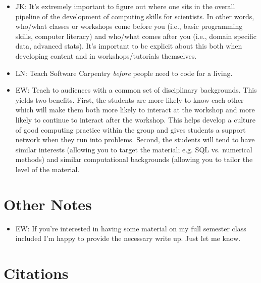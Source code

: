 \documentclass{article}
\begin{document}
\begin{itemize}
  \item JK: It's extremely important to figure out where one sits in the overall pipeline of the development of computing skills for scientists. In other words, who/what classes or workshops come before you (i.e., basic programming skills, computer literacy) and who/what comes after you (i.e., domain specific data, advanced stats). It's important to be explicit about this both when developing content and in workshops/tutorials themselves.

  \item LN: Teach Software Carpentry \emph{before} people need to code for a living.

  \item EW: Teach to audiences with a common set of disciplinary backgrounds. This yields two benefits. First, the students are more likely to know each other which will make them both more likely to interact at the workshop and more likely to continue to interact after the workshop. This helps develop a culture of good computing practice within the group and gives students a support network when they run into problems. Second, the students will tend to have similar interests (allowing you to target the material; e.g. SQL vs. numerical methods) and similar computational backgrounds (allowing you to tailor the level of the material.

\end{itemize}

\section{Other Notes}

\begin{itemize}

  \item EW: If you're interested in having some material on my full semester class included I'm happy to provide the necessary write up. Just let me know.

\end{itemize}

\section{Citations}

\cite{hannay2009}
\cite{prabhu2011}
\cite{wilson1996}
\cite{wilson2006a}
\cite{wilson2006b}
\cite{wilson2009}



\end{document}
